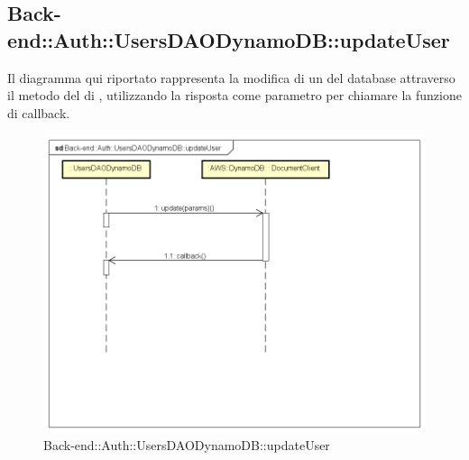 \subsection{Back-end::Auth::UsersDAODynamoDB::updateUser}
Il diagramma qui riportato rappresenta la modifica di un  del database attraverso il metodo  del  di , utilizzando la risposta come parametro per chiamare la funzione di callback.
\begin{figure}[h] \centering \includegraphics[width=\textwidth,height=\textheight,keepaspectratio]{images/diagrams/back-end/Ufficial_Backend/Back-endAuthUsersDAODynamoDBupdateUser.png} 	\caption{Back-end::Auth::UsersDAODynamoDB::updateUser}
\end{figure}
\newpage


